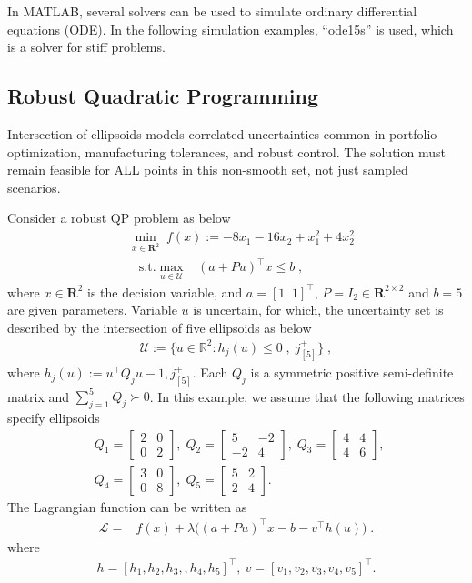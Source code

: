 \documentclass[journal,twoside,web]{ieeecolor}
\newcommand{\rev}[1]{\textcolor{revisionblue}{#1}}
\begin{document}
In MATLAB, several solvers can be used to simulate ordinary differential equations (ODE). In the following simulation examples, ``ode15s'' is used, which is a solver for stiff problems.

\subsection{Robust Quadratic Programming}

\rev{Intersection of ellipsoids models correlated uncertainties common in portfolio optimization, manufacturing tolerances, and robust control. The solution must remain feasible for ALL points in this non-smooth set, not just sampled scenarios.}

Consider a robust QP problem as below
\begin{align} \label{ro_simulation}
&\min_{x \in \mathbf{R}^2} \;f(x):=-8x_1-16x_2+x_1^2+4x_2^2\nonumber\\
&\;\;\;\text{s.t.} \max_{u\in \mathcal{U}} \;\;\; (a+Pu)^\top x\leq b\;,
\end{align}
where $x \in \mathbf{R}^2$ is the decision variable, and $a =[1\;\;1]^\top$, $P=I_2 \in \mathbf{R}^{2 \times 2}$ and $b=5$ are given parameters. Variable $u$ is uncertain, for which, the uncertainty set is described by the intersection of five ellipsoids as below
\begin{align*}\mathcal{U}:=\{u \in \mathbb{R}^{2}:h_{j}(u) \leq 0\;,\; j^+_{[5]}\}\;,\end{align*}
where
$h_j(u):=u^\top Q_j u-1, j^+_{[5]}$. Each $Q_{j}$ is a symmetric positive semi-definite matrix and $ \sum_{j=1}^{5} Q_j \succ 0$. In this example, we assume that the following matrices specify ellipsoids
\begin{align*}
&Q_1=\left[\begin{array}{ccl} 2 & 0\\0 & 2 \end{array}\right],\; Q_2=\left[\begin{array}{ccl} 5 & -2\\-2 & 4  \end{array}\right],\; Q_3=\left[\begin{array}{ccl} 4 & 4\\4 & 6\end{array}\right],\;\\
&Q_4=\left[\begin{array}{ccl} 3 & 0\\0 & 8 \end{array}\right],\;
Q_5=\left[\begin{array}{ccl} 5 & 2\\2 & 4 \end{array}\right].
\end{align*}
The Lagrangian function can be written as
\begin{align*}
\mathcal{L}=&f(x)+\lambda \big((a+Pu)^\top x-b-v ^\top h(u)\big)\;.
\end{align*}
where
\begin{align*}
h=[h_1,h_2,h_3,,h_4,h_5]^\top ,\ v=[v_1,v_2,v_3,v_4,v_5]^\top.
\end{align*}
\end{document}
